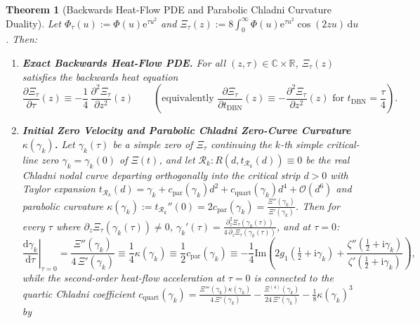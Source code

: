 \documentclass[11pt,reqno]{amsart}
\newtheorem{theorem}{Theorem}[section]
\theoremstyle{definition}
\theoremstyle{remark}
\numberwithin{equation}{section}
\newcommand{\R}{\mathbb{R}}
\newcommand{\C}{\mathbb{C}}
\newcommand{\dd}{\mathrm{d}}
\newcommand{\ee}{\mathrm{e}}
\newcommand{\ii}{\mathrm{i}}
\newcommand{\Ima}{\mathrm{Im}}
\begin{document}
\begin{theorem}[Backwards Heat-Flow PDE and Parabolic Chladni Curvature Duality]\label{thm:chladni_velocity}
Let $\Phi_\tau(u) := \Phi(u)\ee^{\tau u^2}$ and $\Xi_\tau(z) := 8\int_0^\infty \Phi(u)\ee^{\tau u^2}\cos(2zu)\,\dd u$. Then:
\begin{enumerate}[label=\textup{(\roman*)},leftmargin=2.2em]
\item \textbf{Exact Backwards Heat-Flow PDE.} For all $(z, \tau) \in \C \times \R$, $\Xi_\tau(z)$ satisfies the backwards heat equation
\begin{equation}\label{eq:backwards_heat_pde}
\frac{\partial \Xi_\tau}{\partial\tau}(z) \equiv -\frac{1}{4}\,\frac{\partial^2 \Xi_\tau}{\partial z^2}(z) \qquad \left(\text{equivalently } \frac{\partial \Xi_\tau}{\partial t_{\mathrm{DBN}}}(z) \equiv -\frac{\partial^2 \Xi_\tau}{\partial z^2}(z) \text{ for } t_{\mathrm{DBN}} = \frac{\tau}{4}\right).
\end{equation}
\item \textbf{Initial Zero Velocity and Parabolic Chladni Zero-Curve Curvature $\kappa(\gamma_k)$.} Let $\gamma_k(\tau)$ be a simple zero of $\Xi_\tau$ continuing the $k$-th simple critical-line zero $\gamma_k = \gamma_k(0)$ of $\Xi(t)$, and let $\mathcal{R}_k : R(d, t_{\mathcal{R}_k}(d)) \equiv 0$ be the real Chladni nodal curve departing orthogonally into the critical strip $d > 0$ with Taylor expansion $t_{\mathcal{R}_k}(d) = \gamma_k + c_{\mathrm{par}}(\gamma_k)d^2 + c_{\mathrm{quart}}(\gamma_k)d^4 + \mathcal{O}(d^6)$ and parabolic curvature $\kappa(\gamma_k) := t_{\mathcal{R}_k}''(0) = 2c_{\mathrm{par}}(\gamma_k) = \frac{\Xi''(\gamma_k)}{\Xi'(\gamma_k)}$. Then for every $\tau$ where $\partial_z\Xi_\tau(\gamma_k(\tau)) \neq 0$, $\gamma_k'(\tau) = \frac{\partial_z^2\Xi_\tau(\gamma_k(\tau))}{4\,\partial_z\Xi_\tau(\gamma_k(\tau))}$, and at $\tau = 0$:
\begin{equation}\label{eq:gamma_velocity_duality}
\left.\frac{\dd\gamma_k}{\dd\tau}\right|_{\tau=0} = \frac{\Xi''(\gamma_k)}{4\,\Xi'(\gamma_k)} \equiv \frac{1}{4}\kappa(\gamma_k) \equiv \frac{1}{2}c_{\mathrm{par}}(\gamma_k) \equiv -\frac{1}{4}\Ima\!\left(2g_1\!\left(\tfrac{1}{2}+\ii\gamma_k\right) + \frac{\zeta''(\frac{1}{2}+\ii\gamma_k)}{\zeta'(\frac{1}{2}+\ii\gamma_k)}\right),
\end{equation}
while the second-order heat-flow acceleration at $\tau = 0$ is connected to the quartic Chladni coefficient $c_{\mathrm{quart}}(\gamma_k) = \frac{\Xi'''(\gamma_k)\kappa(\gamma_k)}{4\,\Xi'(\gamma_k)} - \frac{\Xi^{(4)}(\gamma_k)}{24\,\Xi'(\gamma_k)} - \frac{1}{8}\kappa(\gamma_k)^3$ by

\end{enumerate}
\end{theorem}
\end{document}
